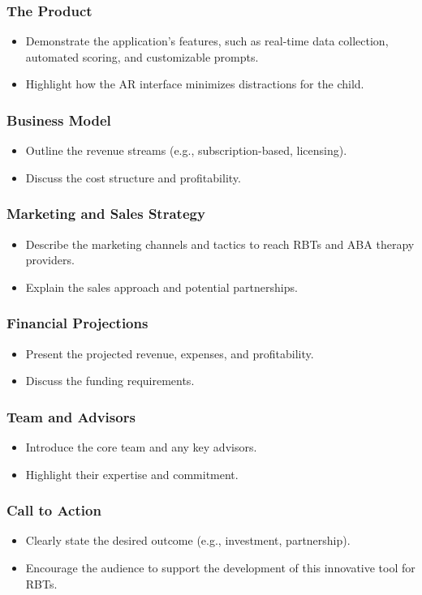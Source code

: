 \documentclass{beamer}
\begin{document}
\begin{frame}
  \frametitle{The Product}
  \begin{itemize}
    \item Demonstrate the application's features, such as real-time data collection, automated scoring, and customizable prompts.
    \item Highlight how the AR interface minimizes distractions for the child.
  \end{itemize}
\end{frame}

\begin{frame}
  \frametitle{Business Model}
  \begin{itemize}
    \item Outline the revenue streams (e.g., subscription-based, licensing).
    \item Discuss the cost structure and profitability.
  \end{itemize}
\end{frame}

\begin{frame}
  \frametitle{Marketing and Sales Strategy}
  \begin{itemize}
    \item Describe the marketing channels and tactics to reach RBTs and ABA therapy providers.
    \item Explain the sales approach and potential partnerships.
  \end{itemize}
\end{frame}

\begin{frame}
  \frametitle{Financial Projections}
  \begin{itemize}
    \item Present the projected revenue, expenses, and profitability.
    \item Discuss the funding requirements.
  \end{itemize}
\end{frame}

\begin{frame}
  \frametitle{Team and Advisors}
  \begin{itemize}
    \item Introduce the core team and any key advisors.
    \item Highlight their expertise and commitment.
  \end{itemize}
\end{frame}

\begin{frame}
  \frametitle{Call to Action}
  \begin{itemize}
    \item Clearly state the desired outcome (e.g., investment, partnership).
    \item Encourage the audience to support the development of this innovative tool for RBTs.
  \end{itemize}
\end{frame}
\end{document}
